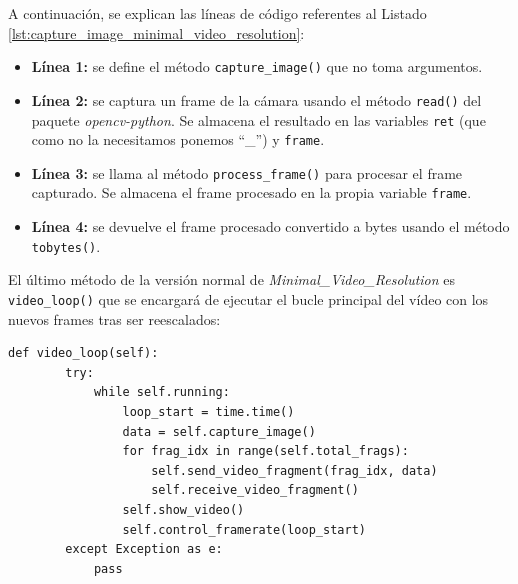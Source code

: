 A continuación, se explican las líneas de código referentes al Listado \ref{lst:capture_image_minimal_video_resolution}:
\begin{itemize}
    \item \textbf{Línea 1:} se define el método \texttt{capture\_image()} que no toma argumentos.
    \item \textbf{Línea 2:} se captura un frame de la cámara usando el método \texttt{read()} del paquete \textit{opencv-python}. Se almacena el resultado en las variables \texttt{ret} (que como no la necesitamos ponemos ``\_'') y \texttt{frame}.
    \item \textbf{Línea 3:} se llama al método \texttt{process\_frame()} para procesar el frame capturado. Se almacena el frame procesado en la propia variable \texttt{frame}.
    \item \textbf{Línea 4:} se devuelve el frame procesado convertido a bytes usando el método \texttt{tobytes()}.
\end{itemize}
\vspace{\baselineskip}

El último método de la versión normal de \textit{Minimal\_Video\_Resolution} es \texttt{video\_loop()} que se encargará de ejecutar el bucle principal del vídeo con los nuevos frames tras ser reescalados:
\begin{lstlisting}[style=pythonstyle, caption={Método \texttt{video\_loop()} de \textit{Minimal\_Video\_Resolution}.}, label={lst:video_loop_minimal_video_resolution}]
def video_loop(self):
        try:
            while self.running:
                loop_start = time.time()
                data = self.capture_image()
                for frag_idx in range(self.total_frags):
                    self.send_video_fragment(frag_idx, data)
                    self.receive_video_fragment()
                self.show_video()
                self.control_framerate(loop_start)
        except Exception as e:
            pass
\end{lstlisting}
\vspace{\baselineskip}

